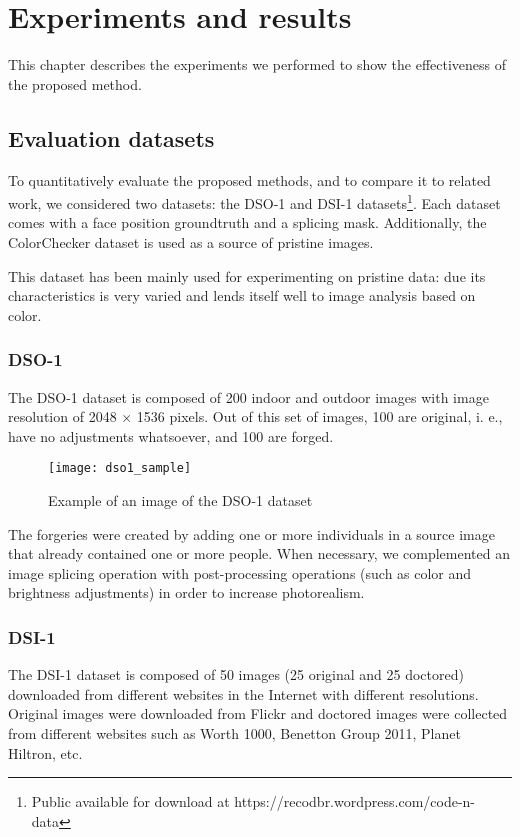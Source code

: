 \chapter{Experiments and results}

This chapter describes the experiments we performed to show the effectiveness of the proposed method. 

\section{Evaluation datasets}
To quantitatively evaluate the proposed methods, and to compare it to related work,
we considered two datasets: the DSO-1 and DSI-1 datasets\footnote{Public available for download at https://recodbr.wordpress.com/code-n-data}. Each dataset comes with a face position groundtruth and a splicing mask. Additionally, the ColorChecker dataset \cite{gehler2008bayesian} is used as a source of pristine images.


This dataset has been mainly used for experimenting on pristine data: due its characteristics is very varied and lends itself well to image analysis based on color.

\subsection{DSO-1}

The DSO-1 dataset is composed of 200 indoor and outdoor images with image resolution of 2048 × 1536 pixels. Out of this set of images, 100 are original, i. e., have no adjustments whatsoever, and 100 are forged. 

\begin{figure}[h!]
  \centering
    \texttt{[image: dso1\_sample]}
    \caption{Example of an image of the DSO-1 dataset}
    \label{fig:dsosample}
\end{figure}

The forgeries were created by adding one or more individuals in a source image that already contained one or more people. When necessary, we complemented an image splicing operation with post-processing operations (such as color and brightness adjustments) in order to increase photorealism.

\subsection{DSI-1}

The DSI-1 dataset is composed of 50 images (25 original and 25 doctored) downloaded from different websites in the Internet with different resolutions. Original images were downloaded from Flickr and doctored images were collected from different websites such as Worth 1000, Benetton Group 2011, Planet Hiltron, etc.

